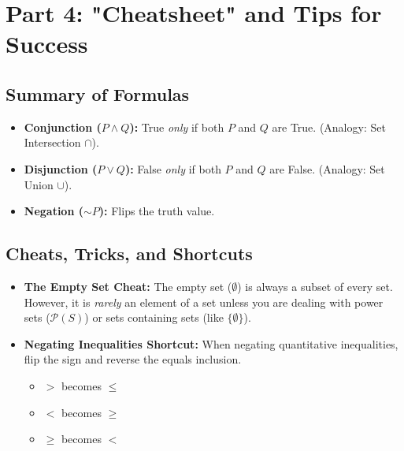 \documentclass[11pt]{article}
\begin{document}
\section{Part 4: "Cheatsheet" and Tips for Success}

\subsection{Summary of Formulas}
\begin{itemize}
    \item \textbf{Conjunction ($P \land Q$):} True \textit{only} if both $P$ and $Q$ are True. (Analogy: Set Intersection $\cap$).
    \item \textbf{Disjunction ($P \lor Q$):} False \textit{only} if both $P$ and $Q$ are False. (Analogy: Set Union $\cup$).
    \item \textbf{Negation ($\sim P$):} Flips the truth value.
\end{itemize}

\subsection{Cheats, Tricks, and Shortcuts}
\begin{itemize}
    \item \textbf{The Empty Set Cheat:} The empty set ($\emptyset$) is always a subset of every set. However, it is \textit{rarely} an element of a set unless you are dealing with power sets ($\mathcal{P}(S)$) or sets containing sets (like $\{\emptyset\}$). 
    \item \textbf{Negating Inequalities Shortcut:} When negating quantitative inequalities, flip the sign and reverse the equals inclusion. 
        \begin{itemize}
            \item $>$ becomes $\le$
            \item $<$ becomes $\ge$
            \item $\ge$ becomes $<$
        \end{itemize}
\end{itemize}
\end{document}
